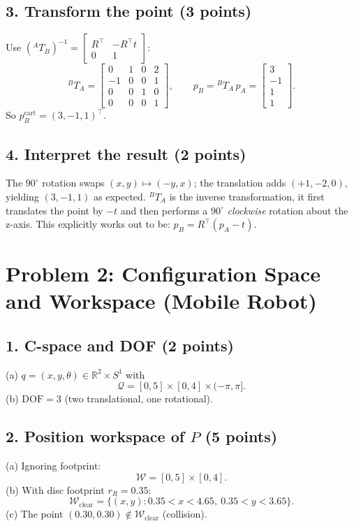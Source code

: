 \documentclass[11pt]{article}
\begin{document}
\subsection*{3. Transform the point (3 points)}
Use ${(^{A}\!T_{B})}^{-1}=\begin{bmatrix}R^\top&-R^\top t\\ 0&1\end{bmatrix}$:
\[
^{B}\!T_{A}=
\begin{bmatrix}
0 & 1 & 0 & 2\\
-1 & 0 & 0 & 1\\
0 & 0 & 1 & 0\\
0 & 0 & 0 & 1
\end{bmatrix},\qquad
p_B = {}^{B}\!T_{A}\,p_A =
\begin{bmatrix} 3\\ -1\\ 1\\ 1\end{bmatrix}.
\]
So $p_B^{\text{cart}}=(3,-1,1)^\top$.

\subsection*{4. Interpret the result (2 points)}
The $90^\circ$ rotation swaps $(x,y)\mapsto(-y,x)$; the translation adds $(+1,-2,0)$, yielding $(3,-1,1)$ as expected. $^{B}\!T_{A}$ is the inverse transformation, it first translates the point by $-t$ and then performs a $90^\circ$ \emph{clockwise} rotation about the z-axis. This explicitly works out to be:
$p_B = R^\top (p_A - t)$.

\section*{Problem 2: Configuration Space and Workspace (Mobile Robot)}

\subsection*{1. C-space and DOF (2 points)}
\noindent
(a) $q=(x,y,\theta)\in\mathbb{R}^2\times S^1$ with
\[
\mathcal{Q}=[0,5]\times[0,4]\times(-\pi,\pi].
\]
(b) $\mathrm{DOF}=3$ (two translational, one rotational).

\subsection*{2. Position workspace of $P$ (5 points)}
(a) Ignoring footprint:
\[
\mathcal{W}=[0,5]\times[0,4].
\]
(b) With disc footprint $r_R=0.35$:
\[
\mathcal{W}_{\text{clear}}=\{(x,y): 0.35 < x < 4.65,\ 0.35 < y < 3.65\}.
\]
(c) The point $(0.30,0.30)\notin\mathcal{W}_{\text{clear}}$ (collision).
\end{document}
